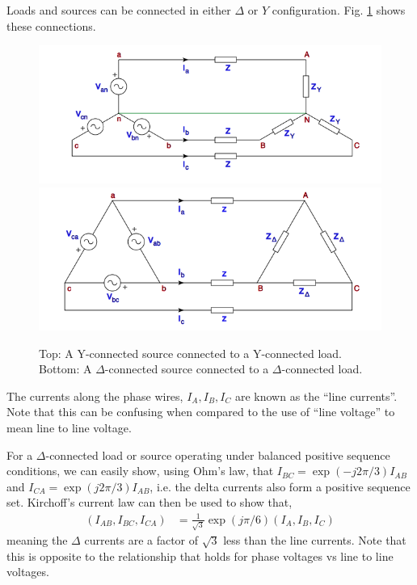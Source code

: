 \documentclass[10pt]{article}
\begin{document}
Loads and sources can be connected in either $\Delta$ or $Y$ configuration. Fig. \ref{FIG_YY_DD} shows these connections.
\begin{figure}[!h]
	\begin{center}
		\includegraphics[width=(12cm)]{YSrcYLd.png}
		\includegraphics[width=(12cm)]{DSrcDLd.png}
	\end{center}
	\caption{
		Top: A Y-connected source connected to a Y-connected load. Bottom: A $\Delta$-connected source connected to a $\Delta$-connected load.
	}
	\label{FIG_YY_DD}
\end{figure}

The currents along the phase wires, $I_A, I_B, I_C$ are known as the ``line currents''. Note that this can be confusing when compared to the use of ``line voltage'' to mean line to line voltage.

For a $\Delta$-connected load or source operating under balanced positive sequence conditions, we can easily show, using Ohm's law, that $I_{BC} = \exp(-j2\pi/3) I_{AB}$ and $I_{CA} = \exp(j2\pi/3) I_{AB}$, i.e. the delta currents also form a positive sequence set. Kirchoff's current law can then be used to show that,
\begin{align}
(I_{AB}, I_{BC}, I_{CA}) &= \frac{1}{\sqrt{3}}\exp\left(j\pi/6\right)(I_A, I_B, I_C)
\end{align}
meaning the $\Delta$ currents are a factor of $\sqrt{3}$ less than the line currents. Note that this is opposite to the relationship that holds for phase voltages vs line to line voltages.
\end{document}
